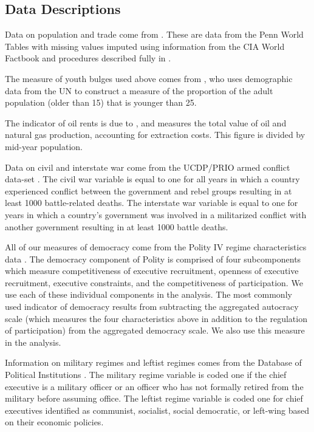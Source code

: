 \documentclass[11pt]{article}
\begin{document}
\subsection{Data Descriptions}

Data on population and trade come from \citet{gleditsch2002expanded}. These are data from the Penn World Tables \citep{summers1991penn} with missing values imputed using information from the CIA World Factbook and procedures described fully in \citet{gleditsch2002expanded}. 

The measure of youth bulges used above comes from \citet{Urdal2006}, who uses demographic data from the UN to construct a measure of the proportion of the adult population (older than 15) that is younger than 25.

The indicator of oil rents is due to \citet{Ross2006}, and measures the total value of oil and natural gas production, accounting for extraction costs. This figure is divided by mid-year population. 

Data on civil and interstate war come from the UCDP/PRIO armed conflict data-set \citep{ThemnerWallensteen2012}. The civil war variable is equal to one for all years in which a country experienced conflict between the government and rebel groups resulting in at least 1000 battle-related deaths. The interstate war variable is equal to one for years in which a country's government was involved in a militarized conflict with another government resulting in at least 1000 battle deaths.

All of our measures of democracy come from the Polity IV regime characteristics data \citep{MarshallJaggers2009}. The democracy component of Polity is comprised of four subcomponents which measure competitiveness of executive recruitment, openness of executive recruitment, executive constraints, and the competitiveness of participation. We use each of these individual components in the analysis. The most commonly used indicator of democracy results from subtracting the aggregated autocracy scale (which measures the four characteristics above in addition to the regulation of participation) from the aggregated democracy scale. We also use this measure in the analysis.  

Information on military regimes and leftist regimes comes from the Database of Political Institutions \citep{beck2001new}. The military regime variable is coded one if the chief executive is a military officer or an officer who has not formally retired from the military before assuming office. The leftist regime variable is coded one for chief executives identified as communist, socialist, social democratic, or left-wing based on their economic policies. 
\end{document}
